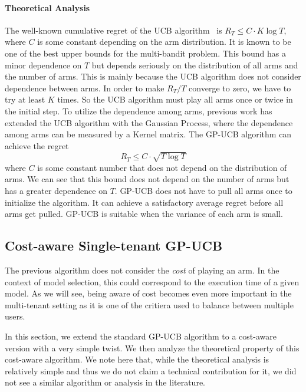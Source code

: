 \documentclass[letterpaper]{vldb}
\begin{document}
\vspace{-0.75em}
\paragraph*{Theoretical Analysis}

The well-known cumulative regret of the UCB algorithm~\cite{DBLP:journals/ftml/BubeckC12} is $R_T \leq C\cdot K\log T$,
where $C$ is some constant depending on the arm distribution. It is known to be one of the best upper bounds for the multi-bandit problem. This bound has a minor dependence on $T$ but depends seriously on the distribution of all arms and the number of arms. This is mainly because the UCB algorithm does not consider dependence between arms. In order to make $R_T/T$ converge to zero, we have to try at least $K$ times. So the UCB algorithm must play all arms once or twice in the initial step. To utilize the dependence among arms, previous work has extended the UCB algorithm with the Gaussian Process, where the dependence among arms can be measured by a Kernel matrix. The GP-UCB algorithm can achieve the regret
\[
R_T \leq C\cdot \sqrt{T\log T}
\]
where $C$ is some constant number that does not depend on the distribution of arms. We can see that this bound does not depend on the number of arms but has a greater dependence on $T$. GP-UCB does not have to pull all arms once to initialize the algorithm. It can achieve a satisfactory average regret before all arms get pulled. GP-UCB is suitable when the variance of each arm is small.




\subsection{Cost-aware Single-tenant GP-UCB}

The previous algorithm does not consider the {\em cost} of playing an arm.
In the context of model selection, this could correspond to the execution
time of a given model. 
As we will see, being aware of cost becomes even more important in the
multi-tenant setting as it is one of the critiera used to balance between
multiple users.

In this section, we extend the standard GP-UCB algorithm to a cost-aware version
with a very simple twist. We then analyze the theoretical property of
this cost-aware algorithm. We note here that, while the theoretical
analysis is relatively simple and thus we do not claim a technical contribution for
it, we did not see a similar algorithm or analysis in the literature.
\end{document}
